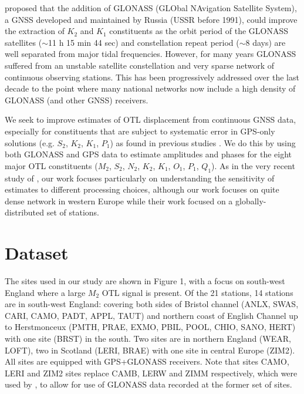 \documentclass[se, manuscript]{copernicus}
\begin{document}
\cite{Urschl2005} proposed that the addition of GLONASS (GLObal NAvigation Satellite System), a GNSS developed and maintained by Russia (USSR before 1991), could improve the extraction of $K_2$ and $K_1$ constituents as the orbit period of the GLONASS satellites ($\sim$11 h 15 min 44 sec) and constellation repeat period ($\sim$8 days) are well separated from major tidal frequencies. However, for many years GLONASS suffered from an unstable satellite constellation and very sparse network of continuous observing stations. This has been progressively addressed over the last decade to the point where many national networks now include a high density of GLONASS (and other GNSS) receivers.

We seek to improve estimates of OTL displacement from continuous GNSS data, especially for constituents that are subject to systematic error in GPS-only solutions (e.g. $S_2$, $K_2$, $K_1$, $P_1$) as found in previous studies \citep{Allinson2004,King2006,Yuan2012}. We do this by using both GLONASS and GPS data to estimate amplitudes and phases for the eight major OTL constituents ($M_2$, $S_2$, $N_2$, $K_2$, $K_1$, $O_1$, $P_1$, $Q_1$). As in the very recent study of \cite{abbaszadeh_benefits_2020}, our work focuses particularly on understanding the sensitivity of estimates to different processing choices, although our work focuses on quite dense network in western Europe while their work focused on a globally-distributed set of stations.

\section{Dataset}
The sites used in our study are shown in Figure 1, with a focus on south-west England where a large $M_2$ OTL signal is present. Of the 21 stations, 14 stations are in south-west England: covering both sides of Bristol channel (ANLX, SWAS, CARI, CAMO, PADT, APPL, TAUT) and northern coast of English Channel up to Herstmonceux (PMTH, PRAE, EXMO, PBIL, POOL, CHIO, SANO, HERT) with one site (BRST) in the south. Two sites are in northern England (WEAR, LOFT), two in Scotland (LERI, BRAE) with one site in central Europe (ZIM2). All sites are equipped with GPS+GLONASS receivers. Note that sites CAMO, LERI and ZIM2 sites replace CAMB, LERW and ZIMM respectively, which were used by \cite{Penna2015}, to allow for use of GLONASS data recorded at the former set of sites.
\end{document}
